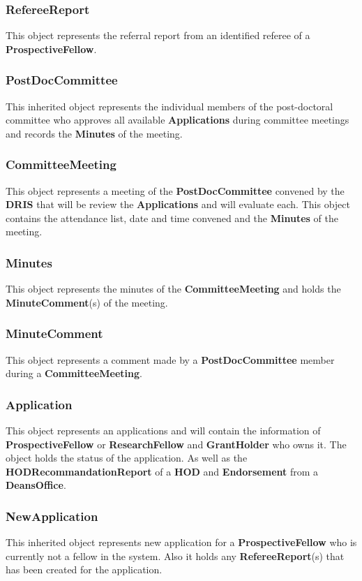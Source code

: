 \documentclass[12pt]{article}
\begin{document}
\subsubsection{RefereeReport}
This object represents the referral report from an identified referee of a \textbf{ProspectiveFellow}.

\subsubsection{PostDocCommittee}
This inherited object represents the individual members of the post-doctoral committee who approves all available \textbf{Applications} during committee meetings and records the \textbf{Minutes} of the meeting.

\subsubsection{CommitteeMeeting}
This object represents a meeting of the \textbf{PostDocCommittee} convened by the \textbf{DRIS} that will be review the \textbf{Applications} and will evaluate each. This object contains the attendance list, date and time convened and the \textbf{Minutes} of the meeting.

\subsubsection{Minutes}
This object represents the minutes of the \textbf{CommitteeMeeting} and holds the \textbf{MinuteComment}(s) of the meeting.

\subsubsection{MinuteComment}
This object represents a comment made by a \textbf{PostDocCommittee} member during a \textbf{CommitteeMeeting}.

\subsubsection{Application}
This object represents an applications and will contain the information of \textbf{ProspectiveFellow} or \textbf{ResearchFellow} and \textbf{GrantHolder} who owns it. The object holds the status of the application. As well as the \textbf{HODRecommandationReport} of a \textbf{HOD} and \textbf{Endorsement} from a \textbf{DeansOffice}.

\subsubsection{NewApplication}
This inherited object represents new application for a \textbf{ProspectiveFellow} who is currently not a fellow in the system. Also it holds any \textbf{RefereeReport}(s) that has been created for the application.
\end{document}
